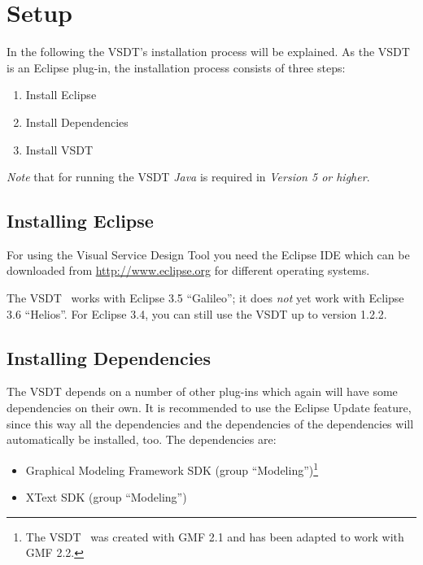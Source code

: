 \chapter{Setup}
\label{sec:user_setup}

In the following the VSDT's installation process will be explained.  As the VSDT
is an Eclipse plug-in, the installation process consists of three steps:
\begin{enumerate}
	\item Install Eclipse
	\item Install Dependencies
	\item Install VSDT
\end{enumerate}

\emph{Note} that for running the VSDT \emph{Java} is required in \emph{Version 5
or higher}.



\section{Installing Eclipse}

For using the Visual Service Design Tool you need the Eclipse IDE which can be
downloaded from \url{http://www.eclipse.org} for different operating systems.

The VSDT \version\ works with Eclipse 3.5 ``Galileo''; it does \emph{not} yet
work with Eclipse 3.6 ``Helios''.  For Eclipse 3.4, you can still use the VSDT
up to version 1.2.2.



\section{Installing Dependencies}

The VSDT depends on a number of other plug-ins which again will have some
dependencies on their own.  It is recommended to use the Eclipse Update feature,
since this way all the dependencies and the dependencies of the dependencies
will automatically be installed, too.  The dependencies are:

\begin{itemize}
	\item Graphical Modeling Framework SDK (group ``Modeling'')\footnote{The VSDT
	\version\ was created with GMF 2.1 and has been adapted to work with GMF 2.2.}
	
	\item XText SDK (group ``Modeling'')
\end{itemize}

